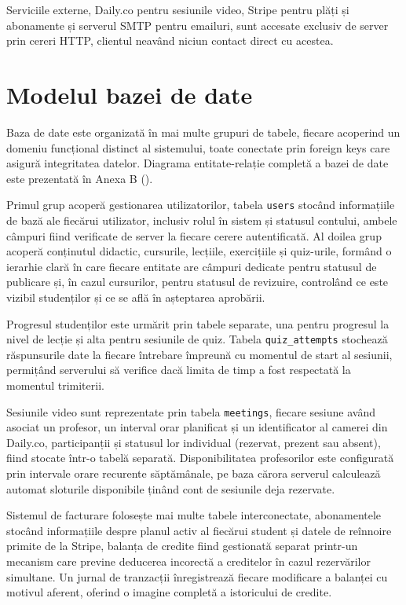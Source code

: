 Serviciile externe, Daily.co pentru sesiunile video, Stripe pentru plăți și abonamente și serverul SMTP pentru emailuri, sunt accesate exclusiv de server prin cereri HTTP, clientul neavând niciun contact direct cu acestea.

\section{Modelul bazei de date}
Baza de date este organizată în mai multe grupuri de tabele, fiecare acoperind un domeniu funcțional distinct al sistemului, toate conectate prin foreign keys care asigură integritatea datelor. Diagrama entitate-relație completă a bazei de date este prezentată în Anexa B ().

Primul grup acoperă gestionarea utilizatorilor, tabela \texttt{users} stocând informațiile de bază ale fiecărui utilizator, inclusiv rolul în sistem și statusul contului, ambele câmpuri fiind verificate de server la fiecare cerere autentificată. Al doilea grup acoperă conținutul didactic, cursurile, lecțiile, exercițiile și quiz-urile, formând o ierarhie clară în care fiecare entitate are câmpuri dedicate pentru statusul de publicare și, în cazul cursurilor, pentru statusul de revizuire, controlând ce este vizibil studenților și ce se află în așteptarea aprobării.

Progresul studenților este urmărit prin tabele separate, una pentru progresul la nivel de lecție și alta pentru sesiunile de quiz. Tabela \texttt{quiz\_attempts} stochează răspunsurile date la fiecare întrebare împreună cu momentul de start al sesiunii, permițând serverului să verifice dacă limita de timp a fost respectată la momentul trimiterii.

Sesiunile video sunt reprezentate prin tabela \texttt{meetings}, fiecare sesiune având asociat un profesor, un interval orar planificat și un identificator al camerei din Daily.co, participanții și statusul lor individual (rezervat, prezent sau absent), fiind stocate într-o tabelă separată. Disponibilitatea profesorilor este configurată prin intervale orare recurente săptămânale, pe baza cărora serverul calculează automat sloturile disponibile ținând cont de sesiunile deja rezervate.

Sistemul de facturare folosește mai multe tabele interconectate, abonamentele stocând informațiile despre planul activ al fiecărui student și datele de reînnoire primite de la Stripe, balanța de credite fiind gestionată separat printr-un mecanism care previne deducerea incorectă a creditelor în cazul rezervărilor simultane. Un jurnal de tranzacții înregistrează fiecare modificare a balanței cu motivul aferent, oferind o imagine completă a istoricului de credite.

